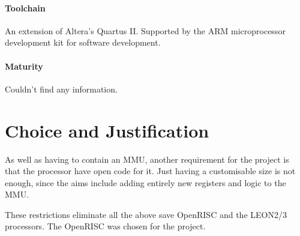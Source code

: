 \paragraph{Toolchain} An extension of Altera's Quartus II. Supported by the ARM microprocessor development kit for software development.
\paragraph{Maturity} Couldn't find any information.

\section{Choice and Justification}
As well as having to contain an MMU, another requirement for the project is that the processor have open code for it. Just having a customisable size is not enough, since the aims include adding entirely new registers and logic to the MMU.

These restrictions eliminate all the above save OpenRISC and the LEON2/3 processors. The OpenRISC was chosen for the project.